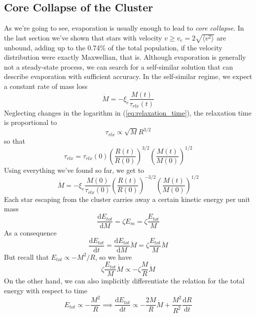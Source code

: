 \subsection{Core Collapse of the Cluster}
As we're going to see, evaporation is usually enough to lead to \emph{core collapse}. In the last section we've shown that stars with velocity $v \geq v_{e} = 2\sqrt{\langle v^{2}\rangle}$ are unbound, adding up to the 0.74\% of the total population, if the velocity distribution were exactly Maxwellian, that is. Although evaporation is generally not a steady-state process, we can search for a self-similar solution that can describe evaporation with suﬃcient accuracy. In the self-similar regime, we expect a
constant rate of mass loss
\begin{equation*}
    \dot{M} = -\xi_{e}\frac{M(t)}{\tau_{rlx}(t)}
\end{equation*}
Neglecting changes in the logarithm in (\ref{eq:relaxation_time}), the relaxation time is proportional to 
\begin{equation*}
    \tau_{rlx} \propto \sqrt{M}R^{3/2}
\end{equation*}
so that 
\begin{equation*}
    \tau_{rlx} = \tau_{rlx}(0) \left(\frac{R(t)}{R(0)}\right)^{3/2}\left(\frac{M(t)}{M(0)}\right)^{1/2}
\end{equation*}
Using everything we've found so far, we get to 
\begin{equation*}
    \dot{M} = -\xi_{e}\frac{M(0)}{\tau_{rlx}(0)}\left(\frac{R(t)}{R(0)}\right)^{-3/2}\left(\frac{M(t)}{M(0)}\right)^{1/2}
\end{equation*}
Each star escaping from the cluster carries away a certain kinetic energy per unit mass 
\begin{equation*}
    \frac{\text{d}E_{tot}}{\text{d}M} = \zeta E_{m} = \zeta \frac{E_{tot}}{M}
\end{equation*}
As a consequence
\begin{equation*}
     \frac{\text{d}E_{tot}}{\text{d}t} =  \frac{\text{d}E_{tot}}{\text{d}M}\dot{M} = \zeta \frac{E_{tot}}{M}\dot{M}
\end{equation*}
But recall that $E_{tot}\propto -M^{2}/R$, so we have
\begin{equation*}
    \zeta \frac{E_{tot}}{M}\dot{M} \propto -\zeta \frac{M}{R}\dot{M}
\end{equation*}
On the other hand, we can also implicitly differentiate the relation for the total energy with respect to time
\begin{equation*}
    E_{tot}\propto -\frac{M^{2}}{R} \implies  \frac{\text{d}E_{tot}}{\text{d}t} \propto -\frac{2M}{R}\dot{M}+\frac{M^{2}}{R^{2}} \frac{\text{d}R}{\text{d}t}
\end{equation*}
